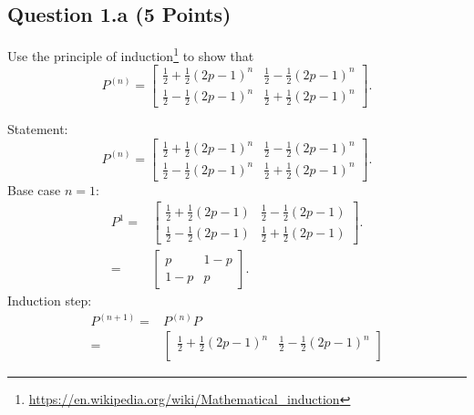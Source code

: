 \documentclass[12pt]{article}
\begin{document}
 \subsection*{Question 1.a (5 Points)} Use the principle of induction\footnote{\url{https://en.wikipedia.org/wiki/Mathematical_induction}} to show that
\[
P^{(n)} = \begin{bmatrix}
\frac{1}{2} + \frac{1}{2}(2p - 1)^n & \frac{1}{2} - \frac{1}{2}(2p - 1)^n \\
\frac{1}{2} - \frac{1}{2}(2p - 1)^n & \frac{1}{2} + \frac{1}{2}(2p - 1)^n
\end{bmatrix}.
\]
\begin{solution}
Statement:
\[
P^{(n)} = \begin{bmatrix}
\frac{1}{2} + \frac{1}{2}(2p - 1)^n & \frac{1}{2} - \frac{1}{2}(2p - 1)^n \\
\frac{1}{2} - \frac{1}{2}(2p - 1)^n & \frac{1}{2} + \frac{1}{2}(2p - 1)^n
\end{bmatrix}.
\]
Base case $n=1$:
\begin{align}
P^1 = & \begin{bmatrix}
\frac{1}{2} + \frac{1}{2}(2p - 1) & \frac{1}{2} - \frac{1}{2}(2p - 1) \\
\frac{1}{2} - \frac{1}{2}(2p - 1) & \frac{1}{2} + \frac{1}{2}(2p - 1)
\end{bmatrix}. \\
= & \begin{bmatrix}
p & 1 - p \\
1 - p & p 
\end{bmatrix}.
\end{align}
Induction step: 
\begin{align}
P^{(n+1)} = & P^{(n)}P\\
= & \begin{bmatrix}
\frac{1}{2} + \frac{1}{2}(2p - 1)^{n} & \frac{1}{2} - \frac{1}{2}(2p - 1)^{n} \\

\end{bmatrix}
\end{align}
\end{solution}
\end{document}
